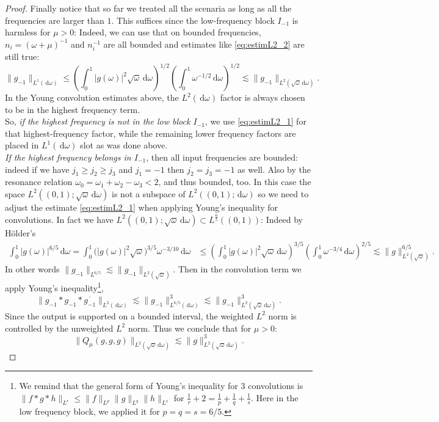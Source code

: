 \documentclass[10pt,a4paper]{amsart}
\newcommand{\dd}{{\, \mathrm d}}
\begin{document}
\begin{proof}
Finally notice that so far we treated all the scenaria as long as all the frequencies are larger than $1$. This suffices since the low-frequency block $I_{-1}$ is harmless for $\mu>0$: Indeed, we can use that on bounded frequencies, $n_i=(\omega+\mu)^{-1}$ and $n_i^{-1}$ are all bounded and estimates like \eqref{eq:estimL2_2} are still true: 
$$
\|g_{-1}\|_{L^1(\dd\omega)} \leq \left(\int_0^1 |g(\omega)|^2\sqrt{\omega} \dd \omega\right)^{1/2}
\left(\int_0^1 \omega^{-1/2} \dd\omega\right)^{1/2}
\lesssim
\|g_{-1}\|_{L^2(\sqrt{\omega}\dd\omega)}.
$$
In the Young convolution estimates above, the $L^2(\dd\omega)$ factor is always chosen to be in the highest frequency term.\\
So, \emph{if the highest frequency is not in the low block $I_{-1}$}, we use
\eqref{eq:estimL2_1} for that highest-frequency factor, 
while the remaining lower frequency factors are placed in $L^1(\dd\omega)$ slot as was done above. \\

\emph{If the highest frequency belongs in $I_{-1}$}, then all input frequencies are bounded: indeed
 if we have $j_1\geq j_2\geq j_3$ and $j_1=-1$ then $j_2= j_3=-1$ as well. Also by the resonance relation $\omega_0= \omega_1+\omega_2-\omega_3<2$, and thus bounded, too.
 In this case the space  $L^2((0,1);\sqrt{\omega}\dd\omega)$ is not a subspace of $L^2((0,1);\dd\omega)$ so we need to adjust the estimate \eqref{eq:estimL2_1} when applying Young's inequality for convolutions.
In fact we have $L^2((0,1);\sqrt{\omega}\dd\omega) \subset L^{\frac{6}{5}}((0,1))$: Indeed by H\"{o}lder's  
\begin{align*}
\int_0^1 |g(\omega)|^{6/5}\dd\omega =\int_0^1 \Big(|g(\omega)|^2\sqrt{\omega} \Big)^{3/5}\omega^{-3/10}\dd\omega & \leq \left(\int_0^1|g(\omega)|^2\sqrt{\omega}\dd\omega\right)^{3/5}
\left(\int_0^1\omega^{-3/4}\dd\omega\right)^{2/5} \lesssim \|g\|_{L^2(\sqrt{\omega})}^{6/5}.
\end{align*} 
In other words $\|g_{-1}\|_{L^{6/5}} \lesssim \|g_{-1}\|_{L^2(\sqrt{\omega})}$. Then in the convolution term we apply Young's inequality\footnote{We remind that the general form of Young's  inequality for 3 convolutions is $\|f \ast g \ast h \|_{L^r} 
\leq 
\|f\|_{L^p} \|g\|_{L^q} \|h\|_{L^s} $ for $\frac{1}{r}+2 = \frac{1}{p} + \frac{1}{q}+ \frac{1}{s}$. Here in the low frequency block, we applied it for $p=q=s=6/5$.},
$$
\|g_{-1}*g_{-1}*\overline{ g_{-1}}\|_{L^2(\dd\omega)}
\lesssim \|g_{-1}\|_{L^{6/5}(\dd\omega)}^3
\lesssim \|g_{-1}\|_{L^2(\sqrt{\omega}\dd\omega)}^3.
$$
Since the output is supported on a bounded interval, the weighted $L^2$ norm is controlled by the unweighted $L^2$ norm.
Thus we conclude that for $\mu>0$:
$$
\|Q_\mu(g,g,g) \|_{L^2(\sqrt{\omega}\dd\omega)} \lesssim \|g\|_{L^2(\sqrt{\omega}\dd\omega)}^3. 
$$ 


\end{proof}
\end{document}
